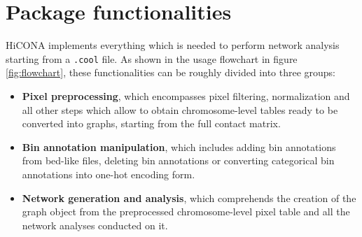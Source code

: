 \section{Package functionalities}
HiCONA implements everything which is needed to perform network analysis starting from a \texttt{.cool} file. As shown in the usage flowchart in figure \ref{fig:flowchart}, these functionalities can be roughly divided into three groups:
\begin{itemize}\tightlist
  \item \textbf{Pixel preprocessing}, which encompasses pixel filtering, normalization and all other steps which allow to obtain chromosome-level tables ready to be converted into graphs, starting from the full contact matrix.
  \item \textbf{Bin annotation manipulation}, which includes adding bin annotations from bed-like files, deleting bin annotations or converting categorical bin annotations into one-hot encoding form.
  \item \textbf{Network generation and analysis}, which comprehends the creation of the graph object from the preprocessed chromosome-level pixel table and all the network analyses conducted on it.
\end{itemize} 

